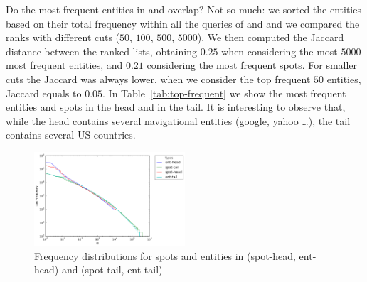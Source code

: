 Do the most frequent entities in \ehead{} and \etail{} overlap? Not so much: we sorted the entities
based on their total frequency within all the queries of \head{} and \tail{} and we compared
the ranks with different cuts ($50$, $100$, $500$, $5000$). We then computed the Jaccard distance
between the ranked lists, obtaining $0.25$ when considering the most $5000$ most frequent entities,
and $0.21$ considering the most frequent spots. For smaller cuts the Jaccard was always lower, 
when we consider the top frequent $50$ entities, Jaccard equals to $0.05$. In Table~\ref{tab:top-frequent}
we show the most frequent entities and spots in the head and in the tail. It is interesting to 
observe that, while the head contains several navigational entities (google, yahoo \dots), the 
tail contains several US countries.



\begin{figure}
  \centering
    \includegraphics[width = 0.5\textwidth]{images/head-tail-ent-spot-dist.png}
	\caption{Frequency distributions for spots and entities in \head{} (spot-head, ent-head) and \tail{} (spot-tail, ent-tail)}
\label{img:distributions}
\end{figure}













